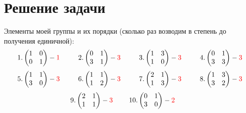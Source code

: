 \documentclass[11pt, fleqn]{article}
\begin{document}
    \section{Решение задачи}
    \begin{sol}
        Элементы моей группы и их порядки (сколько раз возводим в степень до получения единичной):
        \[\ 1. \begin{pmatrix}
            1 & 0\\
            0 & 1
        \end{pmatrix} - \textcolor{red}{1} \qquad\ \
        2. \begin{pmatrix}
            0 & 1\\
            3 & 1
        \end{pmatrix} - \textcolor{red}{3} \qquad\ \
        3.\begin{pmatrix}
            1 & 3\\
            1 & 0
        \end{pmatrix} - \textcolor{red}{3} \qquad\ \
        4.\begin{pmatrix}
            0 & 1\\
            3 & 3
        \end{pmatrix} - \textcolor{red}{3}\]
        \[\ 5.\begin{pmatrix}
            1 & 1\\
            3 & 0
        \end{pmatrix} - \textcolor{red}{3} \qquad\ \
        6.\begin{pmatrix}
            1 & 1\\
            1 & 2
        \end{pmatrix} - \textcolor{red}{3} \qquad\ \
        7.\begin{pmatrix}
            2 & 1\\
            1 & 3
        \end{pmatrix} - \textcolor{red}{3} \qquad\ \
        8.\begin{pmatrix}
            1 & 3\\
            3 & 2
        \end{pmatrix} - \textcolor{red}{3}\]
        \[\ 9.\begin{pmatrix}
            2 & 1\\
            1 & 1
        \end{pmatrix} - \textcolor{red}{3} \qquad\
        10.\begin{pmatrix}
            0 & 1\\
            3 & 0
        \end{pmatrix} - \textcolor{red}{2} \qquad
\]
\end{sol}
\end{document}
